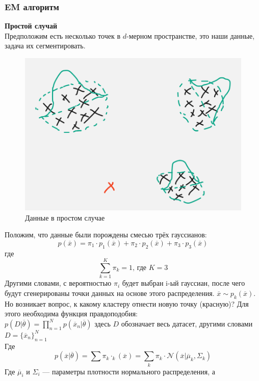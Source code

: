\subsubsection{EM алгоритм}
\noindent \textbf{Простой случай}
\\
Предположим есть несколько точек в $d$-мерном пространстве, это наши данные, задача их сегментировать.
\begin{figure}[ht]
    \includegraphics[scale=0.5]{src/Design/assets/em_picture.png}
    \caption{Данные в простом случае}
\end{figure}
Положим, что данные были порождены смесью трёх гауссианов:
\[p(\overline{x}) = \pi_1\cdot p_1(\overline{x}) + \pi_2\cdot p_2(\overline{x}) + \pi_3\cdot p_3(\overline{x}) \]
где
\[\sum\limits_{k=1}^{K} \pi_k = 1 \text{, где } K=3\]
Другими словами, с вероятностью $\pi_i$ будет выбран i-ый гауссиан, после чего будут сгенерированы точки данных на основе этого распределения. 
$\overline{x} \sim p_k(\overline{x})$.
Но возникает вопрос, к какому кластеру отнести новую точку (красную)?
Для этого необходима функция правдоподобия: \\
$\displaystyle p(D|\overline{\theta}) = \prod\limits_{n=1}^N p(\overline{x}_n | \overline{\theta})$ здесь $D$ обозначает весь датасет, другими словами \\$D = \{\overline{x}_n \} _{n=1}^N$
\\
Где
\[p(\overline{x} | \overline{\theta}) = \sum\pi_k\cdotp_k(\overline{x}) = \sum\limits_{k}\pi_k\cdot\mathcal{N}(\overline{x}|\overline{\mu}_k, \Sigma_k)\]
Где $\overline{\mu}_i \text{ и } \Sigma_i$ --- параметры плотности нормального распределения, а

